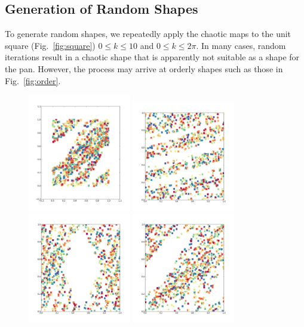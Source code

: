 \documentclass[12pt,draft]{reedmcm}
\begin{document}
\subsection{Generation of Random Shapes}
To generate random shapes, we repeatedly apply the chaotic maps to the unit square (Fig.~\ref{fig:square}) $0 \leq k \leq 10$ and $0 \leq k \leq 2\pi$.
In many cases, random iterations result in a chaotic shape that is apparently not suitable as a shape for the pan. 
However, the process may arrive at orderly shapes such as those in Fig.~\ref{fig:order}.
\begin{figure}[h!]
  \centering
  \includegraphics[width=0.4\textwidth]{random2}
  \includegraphics[width=0.4\textwidth]{random128}
  \includegraphics[width=0.4\textwidth]{random256}
  \includegraphics[width=0.4\textwidth]{random1280}

\end{figure}
\end{document}
